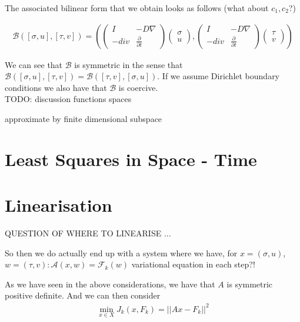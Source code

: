 \documentclass[../draft_1.tex]{subfiles}
\begin{document}
The associated bilinear form that we obtain looks as follows (what about $c_1, c_2$?)
\begin{ceqn}
\begin{equation}
\begin{aligned}
\mathcal{B} ([\sigma, u], [\tau, v]) = \left( \begin{pmatrix} 
 I & - D \nabla \\
-div & \frac{\partial}{\partial t}
\end{pmatrix} 
\begin{pmatrix}
\sigma \\
u
\end{pmatrix}, 
\begin{pmatrix}
 I & - D \nabla \\
-div & \frac{\partial}{\partial t}
\end{pmatrix}
\begin{pmatrix}
\tau \\
v
\end{pmatrix} \right)
\end{aligned}
\end{equation}
\end{ceqn}
We can see that $\mathcal{B}$ is symmetric in the sense that $\mathcal{B}([\sigma, u], [\tau, v]) = \mathcal{B}([\tau, v], [\sigma, u])$. If we assume Dirichlet boundary conditions we also have that $\mathcal{B}$ is coercive.  \\
TODO: discussion functions spaces

approximate by finite dimensional subspace


\section{Least Squares in Space - Time}



\section{Linearisation}


QUESTION OF WHERE TO LINEARISE ...



So then we do actually end up with a system where we have, for $x = (\sigma, u)$, $w = (\tau, v) : \mathcal{A}(x, w) = \mathcal{F}_k(w)$ variational equation in each step?! 

As we have seen in the above considerations, we have that $A$ is symmetric positive definite. And we can then consider 
\begin{align*}
\min_{x \in X} J_k(x, F_k) = || A x - F_k ||^2
\end{align*}
\end{document}
